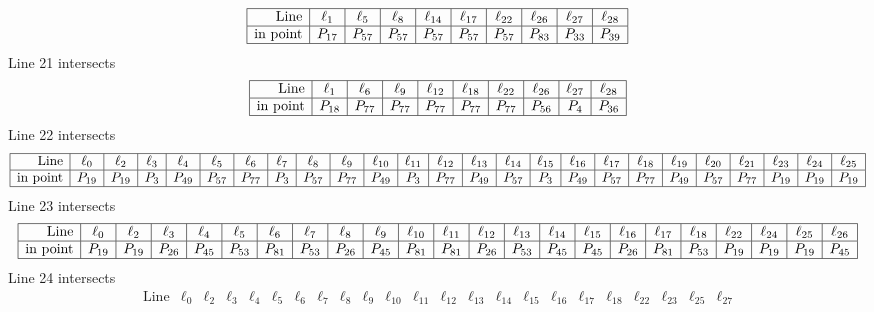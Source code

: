 \documentclass{article}
\begin{document}
{$$\begin{array}{|r*{9}{|c}|}
\hline
\mbox{Line}  & \ell_{1} & \ell_{5} & \ell_{8} & \ell_{14} & \ell_{17} & \ell_{22} & \ell_{26} & \ell_{27} & \ell_{28}\\
\hline
\mbox{in point}  & P_{17} & P_{57} & P_{57} & P_{57} & P_{57} & P_{57} & P_{83} & P_{33} & P_{39}\\
\hline
\end{array}
$$
Line 21 intersects 
$$
\begin{array}{|r*{9}{|c}|}
\hline
\mbox{Line}  & \ell_{1} & \ell_{6} & \ell_{9} & \ell_{12} & \ell_{18} & \ell_{22} & \ell_{26} & \ell_{27} & \ell_{28}\\
\hline
\mbox{in point}  & P_{18} & P_{77} & P_{77} & P_{77} & P_{77} & P_{77} & P_{56} & P_{4} & P_{36}\\
\hline
\end{array}
$$
Line 22 intersects 
$$
\begin{array}{|r*{24}{|c}|}
\hline
\mbox{Line}  & \ell_{0} & \ell_{2} & \ell_{3} & \ell_{4} & \ell_{5} & \ell_{6} & \ell_{7} & \ell_{8} & \ell_{9} & \ell_{10} & \ell_{11} & \ell_{12} & \ell_{13} & \ell_{14} & \ell_{15} & \ell_{16} & \ell_{17} & \ell_{18} & \ell_{19} & \ell_{20} & \ell_{21} & \ell_{23} & \ell_{24} & \ell_{25}\\
\hline
\mbox{in point}  & P_{19} & P_{19} & P_{3} & P_{49} & P_{57} & P_{77} & P_{3} & P_{57} & P_{77} & P_{49} & P_{3} & P_{77} & P_{49} & P_{57} & P_{3} & P_{49} & P_{57} & P_{77} & P_{49} & P_{57} & P_{77} & P_{19} & P_{19} & P_{19}\\
\hline
\end{array}
$$
Line 23 intersects 
$$
\begin{array}{|r*{22}{|c}|}
\hline
\mbox{Line}  & \ell_{0} & \ell_{2} & \ell_{3} & \ell_{4} & \ell_{5} & \ell_{6} & \ell_{7} & \ell_{8} & \ell_{9} & \ell_{10} & \ell_{11} & \ell_{12} & \ell_{13} & \ell_{14} & \ell_{15} & \ell_{16} & \ell_{17} & \ell_{18} & \ell_{22} & \ell_{24} & \ell_{25} & \ell_{26}\\
\hline
\mbox{in point}  & P_{19} & P_{19} & P_{26} & P_{45} & P_{53} & P_{81} & P_{53} & P_{26} & P_{45} & P_{81} & P_{81} & P_{26} & P_{53} & P_{45} & P_{45} & P_{26} & P_{81} & P_{53} & P_{19} & P_{19} & P_{19} & P_{45}\\
\hline
\end{array}
$$
Line 24 intersects 
$$
\begin{array}{|r*{22}{|c}|}
\hline
\mbox{Line}  & \ell_{0} & \ell_{2} & \ell_{3} & \ell_{4} & \ell_{5} & \ell_{6} & \ell_{7} & \ell_{8} & \ell_{9} & \ell_{10} & \ell_{11} & \ell_{12} & \ell_{13} & \ell_{14} & \ell_{15} & \ell_{16} & \ell_{17} & \ell_{18} & \ell_{22} & \ell_{23} & \ell_{25} & \ell_{27}\\

\end{array}$$}
\end{document}
